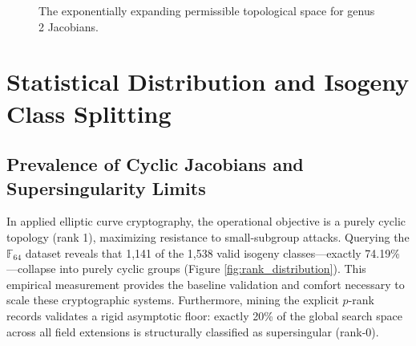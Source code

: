 \documentclass[11pt,letterpaper]{article}
\begin{document}
\begin{figure}[htpb]
\centering
{}
\caption{The exponentially expanding permissible topological space for genus 2 Jacobians.}
\label{fig:hasse_weil_bounds}
\end{figure}

\section{Statistical Distribution and Isogeny Class Splitting}

\subsection{Prevalence of Cyclic Jacobians and Supersingularity Limits}
In applied elliptic curve cryptography, the operational objective is a purely cyclic topology (rank 1), maximizing resistance to small-subgroup attacks. Querying the $\mathbb{F}_{64}$ dataset reveals that 1,141 of the 1,538 valid isogeny classes---exactly 74.19\%---collapse into purely cyclic groups (Figure \ref{fig:rank_distribution}). This empirical measurement provides the baseline validation and comfort necessary to scale these cryptographic systems. Furthermore, mining the explicit $p$-rank records validates a rigid asymptotic floor: exactly 20\% of the global search space across all field extensions is structurally classified as supersingular (rank-0).
\end{document}
